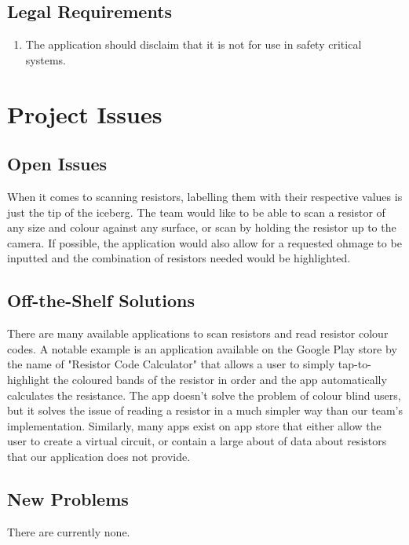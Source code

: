 \documentclass{article}
\begin{document}
\subsection{Legal Requirements}
\begin{enumerate}
\item The application should disclaim that it is not for use in safety critical systems.
\end{enumerate}

\section{Project Issues}

\subsection{Open Issues }
When it comes to scanning resistors, labelling them with their respective values is just the tip of the iceberg. The team would like to be able to scan a resistor of any size and colour against any surface, or scan by holding the resistor up to the camera. If possible, the application would also allow for a requested ohmage to be inputted and the combination of resistors needed would be highlighted.

\subsection{Off-the-Shelf Solutions}
There are many available applications to scan resistors and read resistor colour codes. A notable example is an application available on the Google Play store by the name of "Resistor Code Calculator" that allows a user to simply tap-to-highlight the coloured bands of the resistor in order and the app automatically calculates the resistance. The app doesn't solve the problem of colour blind users, but it solves the issue of reading a resistor in a much simpler way than our team's implementation. Similarly, many apps exist on app store that either allow the user to create a virtual circuit, or contain a large about of data about resistors that our application does not provide.

\subsection{New Problems}
There are currently none.
\end{document}
